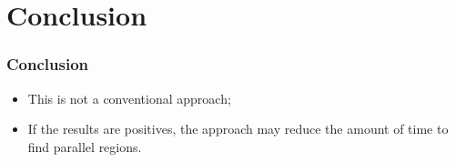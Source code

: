 \documentclass{beamer}
\begin{document}

\section{Conclusion}

\begin{frame}
  \frametitle{Conclusion}

  \begin{itemize}
    \item<1-> This is not a conventional approach;
    \item<2-> If the results are positives, the approach may reduce the amount of time to find parallel regions.
  \end{itemize}
\end{frame}
\end{document}
